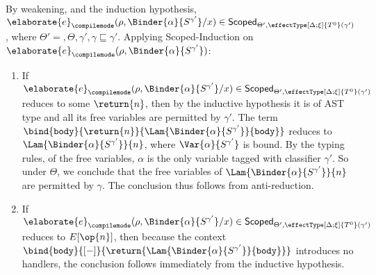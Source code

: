  By weakening, and the induction hypothesis, $\elaborate{e}_{\compilemode}({\rho, \Binder{\alpha}{S^{\gamma'}} / x}) \in \scoped[\Theta']{\effectType[\Delta; \xi]{T^{0}} (\gamma')}$, where $\Theta' = , \Theta, \gamma', \gamma \sqsubseteq \gamma'$. Applying \textsf{Scoped}-Induction on $\elaborate{e}_{\compilemode}({\rho, \Binder{\alpha}{S^{\gamma'}}})$:
\begin{enumerate}
  \item If $\elaborate{e}_{\compilemode}({\rho, \Binder{\alpha}{S^{\gamma'}} / x}) \in \scoped[\Theta']{\effectType[\Delta; \xi]{T^{0}} (\gamma')}$ reduces to some $\return{n}$, then by the inductive hypothesis it is of AST type and all its free variables are permitted by $\gamma'$. The term $\bind{\texttt{body}}{\return{n}}{\Lam{\Binder{\alpha}{S^{\gamma'}}}{\texttt{body}}}$ reduces to $\Lam{\Binder{\alpha}{S^{\gamma'}}}{n}$, where $\Var{\alpha}{S^{\gamma'}}$ is bound. By the typing rules, of the free variables, $\alpha$ is the only variable tagged with classifier $\gamma'$. So under $\Theta$, we conclude that the free variables of $\Lam{\Binder{\alpha}{S^{\gamma'}}}{n}$ are permitted by $\gamma$. The conclusion thus follows from anti-reduction.
  \item If $\elaborate{e}_{\compilemode}({\rho, \Binder{\alpha}{S^{\gamma'}} / x}) \in \scoped[\Theta']{\effectType[\Delta; \xi]{T^{0}} (\gamma')}$ reduces to $E[\op{n}]$, then because the context $\bind{\texttt{body}}{[-]}{\return{\Lam{\Binder{\alpha}{S^{\gamma'}}}{\texttt{body}}}}$ introduces no handlers, the conclusion follows immediately from the inductive hypothesis.
\end{enumerate}

